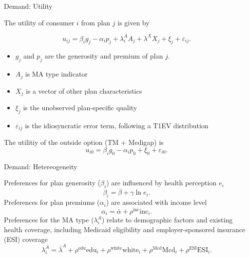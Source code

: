 \documentclass[professionalfonts, aspectratio=169]{beamer}
\begin{document}
\begin{frame}{Demand: Utility}

  The utility of consumer $i$ from plan $j$ is given by

  \begin{equation}
    u_{ij} = \beta_i g_j - \alpha_i p_j + \lambda^{A}_i A_j + \lambda^X X_j + \xi_j + \varepsilon_{ij}.
  \end{equation}

  \begin{itemize}\small
    \item $g_j$ and $p_j$ are the generosity and premium of plan $j$.
    \item $A_j$ is MA type indicator
    \item $X_j$ is a vector of other plan characteristics
    \item $\xi_j$ is the unobserved plan-specific quality
    \item $\varepsilon_{ij}$ is the idiosyncratic error term, following a T1EV distribution
  \end{itemize}

  The utilitiy of the outside option (TM + Medigap) is
  \begin{equation}
    u_{i0} = \beta_i g_0 - \alpha_i p_0 + \xi_0 + \varepsilon_{i0}.
  \end{equation}
\end{frame}

\begin{frame}{Demand: Hetereogeneity}

  Preferences for plan generosity ($\beta_i$) are influenced by health perception $e_i$
  \begin{equation}
      \beta_i = \bar{\beta} + \gamma \ln e_i.
  \end{equation}
  Preferences for plan premiums ($\alpha_i$) are associated with income level
  \begin{equation}
      \alpha_i = \bar{\alpha} + \rho^{\text{inc}} \text{inc}_i.
  \end{equation}
  Preferences for the MA type ($\lambda^{A}_i$) relate to demographic factors and existing health coverage, including Medicaid eligibility and employer-sponsored insurance (ESI) coverage
  \begin{equation}
      \lambda^{A}_i = \bar{\lambda}^{A} + \rho^{\text{edu}} \text{edu}_i + \rho^{\text{white}} \text{white}_i + \rho^{\text{Mcd}} \text{Mcd}_i + \rho^{\text{ESI}} \text{ESI}_i.
  \end{equation}
  
\end{frame}
\end{document}
